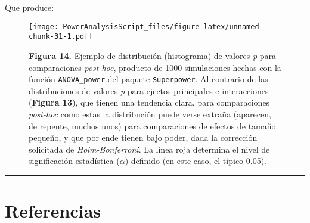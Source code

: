 \documentclass[
]{article}
\begin{document}
Que produce:

\begin{figure}
\centering
\texttt{[image: PowerAnalysisScript\_files/figure-latex/unnamed-chunk-31-1.pdf]}
\caption{\textbf{Figura 14.} Ejemplo de distribución (histograma) de
valores \emph{p} para comparaciones \emph{post-hoc}, producto de 1000
simulaciones hechas con la función \texttt{ANOVA\_power} del paquete
\texttt{Superpower}. Al contrario de las distribuciones de valores
\emph{p} para ejectos principales e interacciones (\textbf{Figura 13}),
que tienen una tendencia clara, para comparaciones \emph{post-hoc} como
estas la distribución puede verse extraña (aparecen, de repente, muchos
unos) para comparaciones de efectos de tamaño pequeño, y que por ende
tienen bajo poder, dada la corrección solicitada de
\emph{Holm-Bonferroni}. La línea roja determina el nivel de
significación estadística (\(\alpha\)) definido (en este caso, el típico
0.05).}
\end{figure}

\begin{center}\rule{0.5\linewidth}{0.5pt}\end{center}

\hypertarget{refs}{%
\section{Referencias}\label{refs}}
\end{document}
